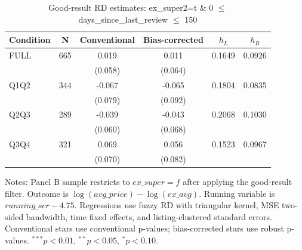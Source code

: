 \begin{table}[!htbp]
\centering
\caption{Good-result RD estimates: ex\_super2=t \& 0 $\leq$ days\_since\_last\_review $\leq$ 150}
\label{tab:good_result_days_since_last_review_150}
\begin{tabular}{lccccc}
\hline
Condition & N & Conventional & Bias-corrected & $h_L$ & $h_R$ \\
\hline
FULL & 665 & 0.019 & 0.011 & 0.1649 & 0.0926 \\
 &  & (0.058) & (0.064) &  &  \\
Q1Q2 & 344 & -0.067 & -0.065 & 0.1804 & 0.0835 \\
 &  & (0.079) & (0.092) &  &  \\
Q2Q3 & 289 & -0.039 & -0.043 & 0.2068 & 0.1030 \\
 &  & (0.060) & (0.068) &  &  \\
Q3Q4 & 321 & 0.069 & 0.056 & 0.1523 & 0.0967 \\
 &  & (0.070) & (0.082) &  &  \\
\hline
\end{tabular}
\begin{flushleft}
\footnotesize Notes: Panel B sample restricts to $ex\_super=f$ after applying the good-result filter. Outcome is $\log(avg\_price)-\log(ex\_avg)$. Running variable is $running\_scr-4.75$. Regressions use fuzzy RD with triangular kernel, MSE two-sided bandwidth, time fixed effects, and listing-clustered standard errors. Conventional stars use conventional p-values; bias-corrected stars use robust p-values. $^{***}p<0.01$, $^{**}p<0.05$, $^{*}p<0.10$.
\end{flushleft}
\end{table}

